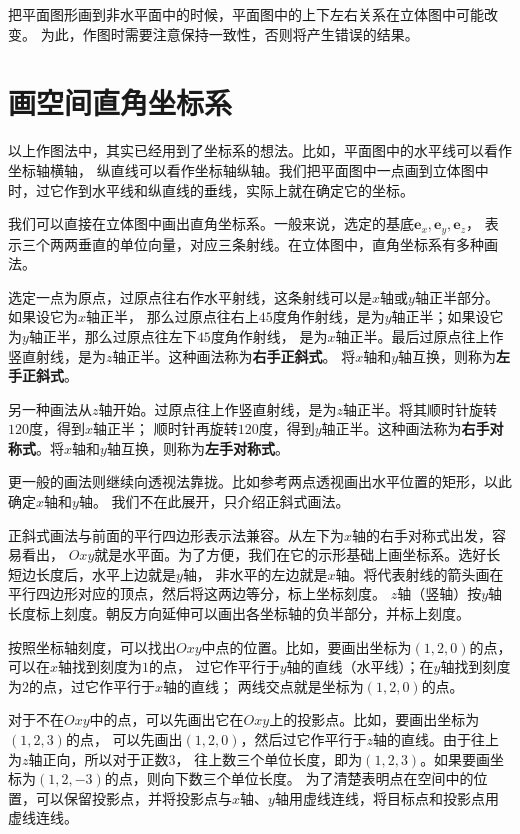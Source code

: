 \documentclass[12pt,UTF8,fontset=none]{ctexbook}
\begin{document}
\begin{appendix}
把平面图形画到非水平面中的时候，平面图中的上下左右关系在立体图中可能改变。
为此，作图时需要注意保持一致性，否则将产生错误的结果。

\section{画空间直角坐标系}

以上作图法中，其实已经用到了坐标系的想法。比如，平面图中的水平线可以看作坐标轴横轴，
纵直线可以看作坐标轴纵轴。我们把平面图中一点画到立体图中时，过它作到水平线和纵直线的垂线，实际上就在确定它的坐标。

我们可以直接在立体图中画出直角坐标系。一般来说，选定的基底$\mathbf{e}_x,\mathbf{e}_y,\mathbf{e}_z$，
表示三个两两垂直的单位向量，对应三条射线。在立体图中，直角坐标系有多种画法。

选定一点为原点，过原点往右作水平射线，这条射线可以是$x$轴或$y$轴正半部分。如果设它为$x$轴正半，
那么过原点往右上$45$度角作射线，是为$y$轴正半；如果设它为$y$轴正半，那么过原点往左下$45$度角作射线，
是为$x$轴正半。最后过原点往上作竖直射线，是为$z$轴正半。这种画法称为\textbf{右手正斜式}。
将$x$轴和$y$轴互换，则称为\textbf{左手正斜式}。

另一种画法从$z$轴开始。过原点往上作竖直射线，是为$z$轴正半。将其顺时针旋转$120$度，得到$x$轴正半；
顺时针再旋转$120$度，得到$y$轴正半。这种画法称为\textbf{右手对称式}。将$x$轴和$y$轴互换，则称为\textbf{左手对称式}。

更一般的画法则继续向透视法靠拢。比如参考两点透视画出水平位置的矩形，以此确定$x$轴和$y$轴。
我们不在此展开，只介绍正斜式画法。

正斜式画法与前面的平行四边形表示法兼容。从左下为$x$轴的右手对称式出发，容易看出，
$Oxy$就是水平面。为了方便，我们在它的示形基础上画坐标系。选好长短边长度后，水平上边就是$y$轴，
非水平的左边就是$x$轴。将代表射线的箭头画在平行四边形对应的顶点，然后将这两边等分，标上坐标刻度。
$z$轴（竖轴）按$y$轴长度标上刻度。朝反方向延伸可以画出各坐标轴的负半部分，并标上刻度。

按照坐标轴刻度，可以找出$Oxy$中点的位置。比如，要画出坐标为$(1,2,0)$的点，可以在$x$轴找到刻度为$1$的点，
过它作平行于$y$轴的直线（水平线）；在$y$轴找到刻度为$2$的点，过它作平行于$x$轴的直线；
两线交点就是坐标为$(1,2,0)$的点。

对于不在$Oxy$中的点，可以先画出它在$Oxy$上的投影点。比如，要画出坐标为$(1,2,3)$的点，
可以先画出$(1,2,0)$，然后过它作平行于$z$轴的直线。由于往上为$z$轴正向，所以对于正数$3$，
往上数三个单位长度，即为$(1,2,3)$。如果要画坐标为$(1,2,-3)$的点，则向下数三个单位长度。
为了清楚表明点在空间中的位置，可以保留投影点，并将投影点与$x$轴、$y$轴用虚线连线，将目标点和投影点用虚线连线。


\end{appendix}
\end{document}
